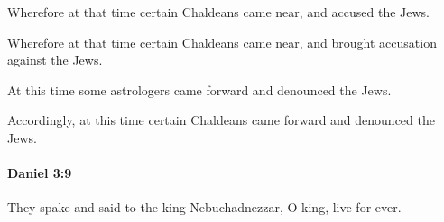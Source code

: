 			Wherefore at that time certain Chaldeans came near, and accused the Jews.

			\begin{versebox}
					\item[BHS] 
					\item[LXX] 
					\item[ASV] Wherefore at that time certain Chaldeans came near, and brought accusation against the Jews.
					\item[NIV] At this time some astrologers came forward and denounced the Jews.
					\item[NRSV] Accordingly, at this time certain Chaldeans came forward and denounced the Jews.
			\end{versebox}

		\paragraph{Daniel 3:9} %
			\label{DANIEL-3-9}

			They spake and said to the king Nebuchadnezzar, O king, live for ever.

